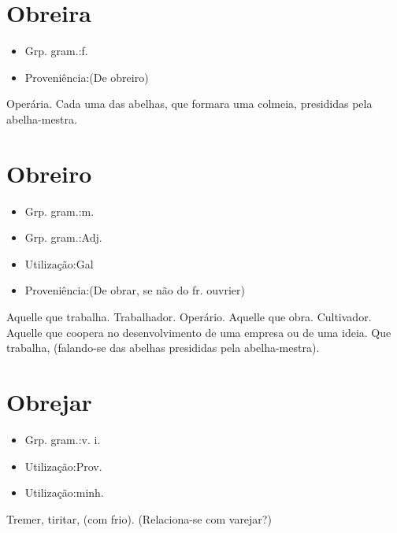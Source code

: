 \section{Obreira}
\begin{itemize}
\item {Grp. gram.:f.}
\end{itemize}
\begin{itemize}
\item {Proveniência:(De \textunderscore obreiro\textunderscore )}
\end{itemize}
Operária.
Cada uma das abelhas, que formara uma colmeia, presididas pela abelha-mestra.
\section{Obreiro}
\begin{itemize}
\item {Grp. gram.:m.}
\end{itemize}
\begin{itemize}
\item {Grp. gram.:Adj.}
\end{itemize}
\begin{itemize}
\item {Utilização:Gal}
\end{itemize}
\begin{itemize}
\item {Proveniência:(De \textunderscore obrar\textunderscore , se não do fr. \textunderscore ouvrier\textunderscore )}
\end{itemize}
Aquelle que trabalha.
Trabalhador.
Operário.
Aquelle que obra.
Cultivador.
Aquelle que coopera no desenvolvimento de uma empresa ou de uma ideia.
Que trabalha, (falando-se das abelhas presididas pela abelha-mestra).
\section{Obrejar}
\begin{itemize}
\item {Grp. gram.:v. i.}
\end{itemize}
\begin{itemize}
\item {Utilização:Prov.}
\end{itemize}
\begin{itemize}
\item {Utilização:minh.}
\end{itemize}
Tremer, tiritar, (com frio).
(Relaciona-se com \textunderscore varejar\textunderscore ?)
